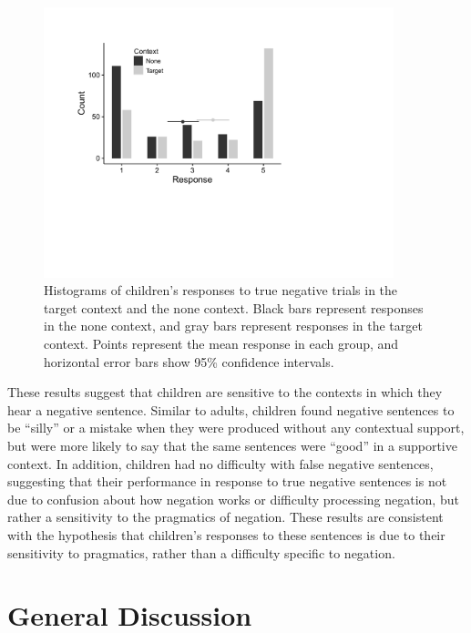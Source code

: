 \documentclass[man, noapacite]{apa2}
\begin{document}
\begin{figure}
\begin{center}
\includegraphics[width=4in]{figures/hist_all.pdf}
\caption{\label{fig:histograms} Histograms of children's responses to true negative trials in the target context and the none context. Black bars represent responses in the none context, and gray bars represent responses in the target context. Points represent the mean response in each group, and horizontal error bars show 95\% confidence intervals.}
\end{center}
\end{figure}

These results suggest that children are sensitive to the contexts in which they hear a negative sentence. Similar to adults, children found negative sentences to be ``silly'' or a mistake when they were produced without any contextual support, but were more likely to say that the same sentences were ``good'' in a supportive context. In addition, children had no difficulty with false negative sentences, suggesting that their performance in response to true negative sentences is not due to confusion about how negation works or difficulty processing negation, but rather a sensitivity to the pragmatics of negation. These results are consistent with the hypothesis that children's responses to these sentences is due to their sensitivity to pragmatics, rather than a difficulty specific to negation.


\section{General Discussion}
\end{document}
